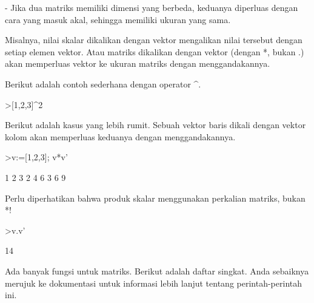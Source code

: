 \documentclass[12pt,arial,letterpaper]{book}
\begin{document}
\begin{eulercomment}
\begin{eulercomment}
\begin{eulercomment}
\begin{eulercomment}
\begin{eulercomment}
\begin{eulercomment}
\begin{eulercomment}
- Jika dua matriks memiliki dimensi yang berbeda, keduanya diperluas
dengan cara yang masuk akal, sehingga memiliki ukuran yang sama.

Misalnya, nilai skalar dikalikan dengan vektor mengalikan nilai
tersebut dengan setiap elemen vektor. Atau matriks dikalikan dengan
vektor (dengan *, bukan .) akan memperluas vektor ke ukuran matriks
dengan menggandakannya.

Berikut adalah contoh sederhana dengan operator \textasciicircum{}.
\end{eulercomment}
\begin{eulerprompt}
>[1,2,3]^2
\end{eulerprompt}
\begin{euleroutput}
  [1,  4,  9]
\end{euleroutput}
\begin{eulercomment}
Berikut adalah kasus yang lebih rumit. Sebuah vektor baris dikali
dengan vektor kolom akan memperluas keduanya dengan menggandakannya.
\end{eulercomment}
\begin{eulerprompt}
>v:=[1,2,3]; v*v'
\end{eulerprompt}
\begin{euleroutput}
              1             2             3 
              2             4             6 
              3             6             9 
\end{euleroutput}
\begin{eulercomment}
Perlu diperhatikan bahwa produk skalar menggunakan perkalian matriks,
bukan *!
\end{eulercomment}
\begin{eulerprompt}
>v.v'
\end{eulerprompt}
\begin{euleroutput}
  14
\end{euleroutput}
\begin{eulercomment}
Ada banyak fungsi untuk matriks. Berikut adalah daftar singkat. Anda
sebaiknya merujuk ke dokumentasi untuk informasi lebih lanjut tentang
perintah-perintah ini.


\end{eulercomment}
\end{eulercomment}
\end{eulercomment}
\end{eulercomment}
\end{eulercomment}
\end{eulercomment}
\end{eulercomment}
\end{document}
